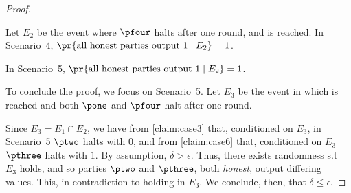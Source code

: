 \begin{proof}

\begin{claim}\label{claim:case4}
Let $E_2$ be the event where $\pfour$ halts after one round, and \agr is reached. In Scenario~4, $\pr{\text{all honest parties output } 1 \mid E_2} =  1$.
\end{claim}
\begin{claim}\label{claim:case6}
In Scenario~5, $\pr{\text{all honest parties output } 1 \mid E_2} = 1$.
\end{claim}
	


To conclude the proof, we focus on Scenario~5. Let $E_3$ be the event in which \agr is reached and both $\pone$ and $\pfour$ halt after one round. %

Since $E_3 = E_1 \cap E_2$, we have from \cref{claim:case3} that, conditioned on $E_3$, in Scenario~5 $\ptwo$  halts with $0$, and from \cref{claim:case6} that, conditioned on $E_3$ $\pthree$ halts with $1$. By assumption, $\delta > \epsilon$. Thus, there exists randomness s.t  $E_3$ holds, and so parties $\ptwo$ and $\pthree$, both \emph{honest}, output differing values. This, in contradiction to \agr holding in $E_3$. We conclude, then, that $\delta \leq \epsilon$.



\end{proof}

